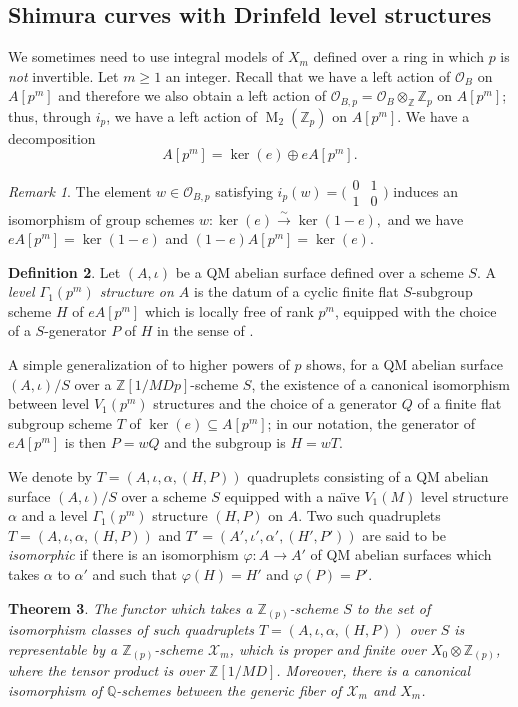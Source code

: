 \documentclass[a4paper,11pt]{amsart}
\numberwithin{equation}{section}
\theoremstyle{plain}
\newtheorem{theorem}{Theorem}[section]
\theoremstyle{definition}
\newtheorem{definition}[theorem]{Definition}
\theoremstyle{remark}
\newtheorem{remark}[theorem]{Remark}
\newcommand{\Q}{\mathbb{Q}}
\newcommand{\Z}{\mathbb{Z}}
\DeclareMathOperator{\M}{M}
\newcommand{\smallmat}[4]{\bigl(\begin{smallmatrix}#1&#2\\#3&#4\end{smallmatrix}\bigr)}
\begin{document}
\subsection{Shimura curves with Drinfeld level structures} 
We sometimes need to use integral models of $X_m$ defined over a ring in which $p$ is \emph{not} invertible. Let $m\geq 1$ an integer. Recall that we have a left action of $\mathcal{O}_B$ on $A[p^m]$ and therefore we also obtain a left action of $\mathcal{O}_{B,p}=\mathcal{O}_B\otimes_\Z\Z_p$ on $A[p^m]$; thus, through $i_p$, we have a left action of $\M_2(\Z_p)$ on $A[p^m]$. 
We have a decomposition
\[A[p^m]=\ker(e)\oplus eA[p^m].\]

\begin{remark} 
The element $w\in \mathcal{O}_{B,p}$ satisfying $i_p(w)=\smallmat 0110$ induces an isomorphism of group schemes $w\colon\ker(e)\overset\sim\rightarrow\ker(1-e),$ and we have $eA[p^m]=\ker(1-e)$ and $(1-e)A[p^m]=\ker(e)$.
\end{remark}

\begin{definition}\label{def-drinfeld}
Let $(A,\iota)$ be a QM abelian surface defined over a scheme $S$. A \emph{level $\Gamma_1(p^m)$ structure on $A$} is the datum of a cyclic finite flat $S$-subgroup scheme $H$ of $eA[p^m]$ which is locally free of rank $p^m$, equipped with the choice of a $S$-generator $P$ of $H$ in the sense of \cite[\S1.4]{KM}.
\end{definition}

A simple generalization of \cite[Lemma 4.4]{Buz} to higher powers of $p$ shows, for a QM abelian surface $(A,\iota)/S$ over a $\Z[1/MDp]$-scheme $S$, the existence of a canonical isomorphism between level $V_1(p^m)$ structures and the choice of a generator $Q$ of a finite flat subgroup scheme $T$ of $\ker(e)\subseteq A[p^m]$; in our notation, the generator of $eA[p^m]$ is then $P=wQ$ and the subgroup is $H=wT$.

We denote by $T=(A,\iota,\alpha,(H,P))$ quadruplets consisting of a QM abelian surface $(A,\iota)/S$ over a scheme $S$ equipped with a na\"{\i}ve $V_1(M)$ level structure $\alpha$ and a level $\Gamma_1(p^m)$ structure $(H,P)$ on $A$. Two such quadruplets $T=(A,\iota,\alpha,(H,P))$ and $T'=(A',\iota',\alpha',(H',P'))$ are said to be \emph{isomorphic} if there is an isomorphism $\varphi\colon A\rightarrow A'$ of QM abelian surfaces which takes $\alpha$ to $\alpha'$ and such that $\varphi(H)=H'$ and $\varphi(P)=P'$.  

\begin{theorem} 
The functor which takes a $\Z_{(p)}$-scheme $S$ to the set of isomorphism classes of such quadruplets $T=(A,\iota,\alpha,(H,P))$ over $S$ is representable by a $\Z_{(p)}$-scheme $\mathcal{X}_{m}$, which is proper and finite over $X_0\otimes\Z_{(p)}$, where the tensor product is over $\Z[1/MD]$. Moreover, there is a canonical isomorphism of $\Q$-schemes between the generic fiber of $\mathcal{X}_{m}$ and $X_m$.
\end{theorem}
\end{document}
